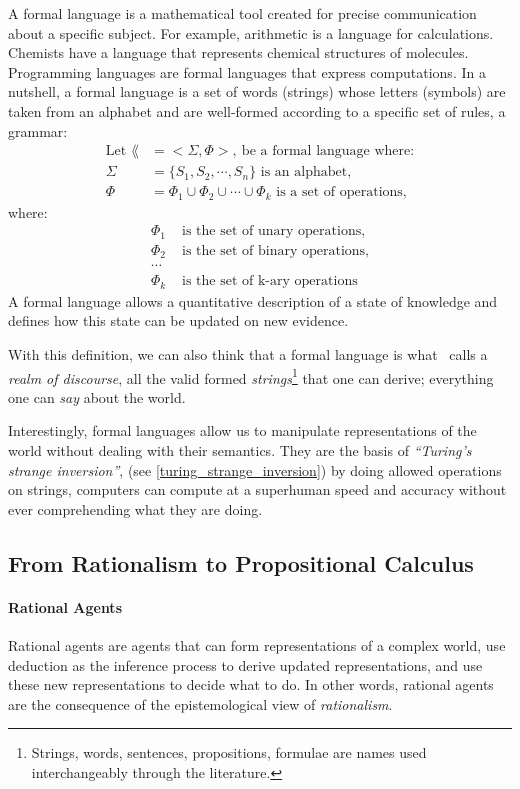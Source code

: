 A formal language is a mathematical tool created for precise communication about a specific subject. For example, arithmetic is a language for calculations. Chemists have a language that represents chemical structures of molecules. Programming languages are formal languages that express computations. In a nutshell, a formal language is a set of words (strings) whose letters (symbols) are taken from an alphabet and are well-formed according to a specific set of rules, a grammar:
\begin{align}
	\text{Let }\lang&= <\Sigma, \Phi>,~\text{be a formal language where:}\\
	\Sigma &= \{S_1, S_2, \cdots, S_n\} \text{ is an alphabet,}\\
	\Phi &= {\Phi_1 \cup \Phi_2 \cup \cdots \cup \Phi_k} \text{ is a set of operations,}
\end{align}
where:
\begin{align}
	\Phi_1 &\text{ is the set of unary operations}, \nonumber\\
	\Phi_2 &\text{ is the set of binary operations}, \nonumber\\
	\cdots &\nonumber \\
	\Phi_k &\text{ is the set of k-ary operations}\nonumber
\end{align}
A formal language allows a quantitative description of a state of knowledge and defines how this state can be updated on new evidence.

With this definition, we can also think that a formal language is what~\citeauthor{sowinski:2016} calls a \emph{realm of discourse}, \ie all the valid formed \emph{strings}\footnote{Strings, words, sentences, propositions, formulae are names used interchangeably through the literature.} that one can derive; everything one can \emph{say} about the world.

Interestingly, formal languages allow us to manipulate representations of the world without dealing with their semantics. They are the basis of \emph{``Turing's strange inversion''}, (see \cref{turing_strange_inversion}) by doing allowed operations on strings, computers can compute at a superhuman speed and accuracy without ever comprehending what they are doing.

\subsection{From Rationalism to Propositional Calculus}
\paragraph{Rational Agents} Rational agents are agents that can form representations of a complex world, use deduction as the inference process to derive updated representations, and use these new representations to decide what to do. In other words, rational agents are the consequence of the epistemological view of \emph{rationalism}.

